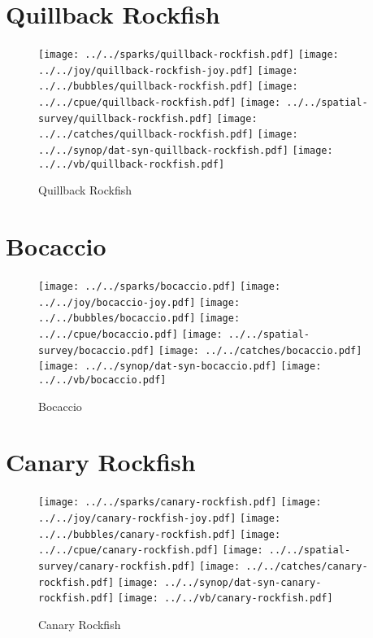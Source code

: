 \section{Quillback Rockfish}

\begin{figure}[htbp]
\centering
\texttt{[image: ../../sparks/quillback-rockfish.pdf]}
\texttt{[image: ../../joy/quillback-rockfish-joy.pdf]}
\texttt{[image: ../../bubbles/quillback-rockfish.pdf]}
\texttt{[image: ../../cpue/quillback-rockfish.pdf]}
\texttt{[image: ../../spatial-survey/quillback-rockfish.pdf]}
\texttt{[image: ../../catches/quillback-rockfish.pdf]}
\texttt{[image: ../../synop/dat-syn-quillback-rockfish.pdf]}
\texttt{[image: ../../vb/quillback-rockfish.pdf]}
\caption{Quillback Rockfish}
\end{figure}
\clearpage
\section{Bocaccio}

\begin{figure}[htbp]
\centering
\texttt{[image: ../../sparks/bocaccio.pdf]}
\texttt{[image: ../../joy/bocaccio-joy.pdf]}
\texttt{[image: ../../bubbles/bocaccio.pdf]}
\texttt{[image: ../../cpue/bocaccio.pdf]}
\texttt{[image: ../../spatial-survey/bocaccio.pdf]}
\texttt{[image: ../../catches/bocaccio.pdf]}
\texttt{[image: ../../synop/dat-syn-bocaccio.pdf]}
\texttt{[image: ../../vb/bocaccio.pdf]}
\caption{Bocaccio}
\end{figure}
\clearpage
\section{Canary Rockfish}

\begin{figure}[htbp]
\centering
\texttt{[image: ../../sparks/canary-rockfish.pdf]}
\texttt{[image: ../../joy/canary-rockfish-joy.pdf]}
\texttt{[image: ../../bubbles/canary-rockfish.pdf]}
\texttt{[image: ../../cpue/canary-rockfish.pdf]}
\texttt{[image: ../../spatial-survey/canary-rockfish.pdf]}
\texttt{[image: ../../catches/canary-rockfish.pdf]}
\texttt{[image: ../../synop/dat-syn-canary-rockfish.pdf]}
\texttt{[image: ../../vb/canary-rockfish.pdf]}
\caption{Canary Rockfish}
\end{figure}
\clearpage
